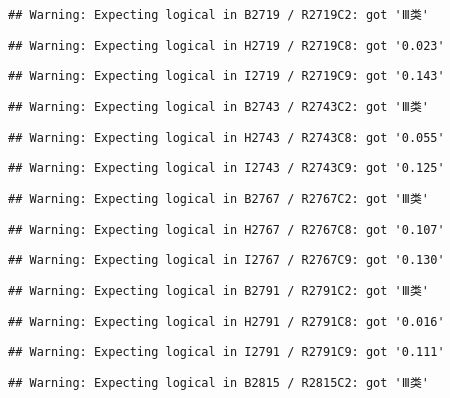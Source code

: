 \documentclass[
]{article}
\begin{document}
\begin{verbatim}
## Warning: Expecting logical in B2719 / R2719C2: got 'Ⅲ类'
\end{verbatim}

\begin{verbatim}
## Warning: Expecting logical in H2719 / R2719C8: got '0.023'
\end{verbatim}

\begin{verbatim}
## Warning: Expecting logical in I2719 / R2719C9: got '0.143'
\end{verbatim}

\begin{verbatim}
## Warning: Expecting logical in B2743 / R2743C2: got 'Ⅲ类'
\end{verbatim}

\begin{verbatim}
## Warning: Expecting logical in H2743 / R2743C8: got '0.055'
\end{verbatim}

\begin{verbatim}
## Warning: Expecting logical in I2743 / R2743C9: got '0.125'
\end{verbatim}

\begin{verbatim}
## Warning: Expecting logical in B2767 / R2767C2: got 'Ⅲ类'
\end{verbatim}

\begin{verbatim}
## Warning: Expecting logical in H2767 / R2767C8: got '0.107'
\end{verbatim}

\begin{verbatim}
## Warning: Expecting logical in I2767 / R2767C9: got '0.130'
\end{verbatim}

\begin{verbatim}
## Warning: Expecting logical in B2791 / R2791C2: got 'Ⅲ类'
\end{verbatim}

\begin{verbatim}
## Warning: Expecting logical in H2791 / R2791C8: got '0.016'
\end{verbatim}

\begin{verbatim}
## Warning: Expecting logical in I2791 / R2791C9: got '0.111'
\end{verbatim}

\begin{verbatim}
## Warning: Expecting logical in B2815 / R2815C2: got 'Ⅲ类'
\end{verbatim}
\end{document}
